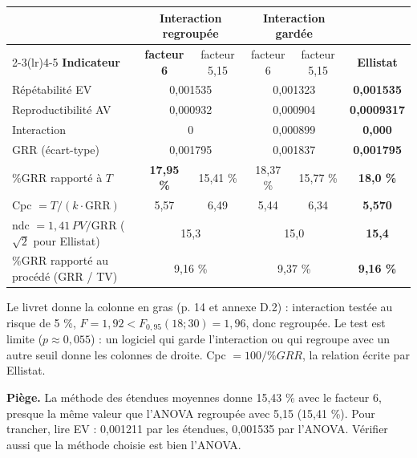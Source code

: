 \documentclass[10pt,a4paper]{article}
\begin{document}
\begin{tabularx}{\linewidth}{@{}X c c c c c@{}}
\toprule
 & \multicolumn{2}{c}{\textbf{Interaction regroupée}} & \multicolumn{2}{c}{\textbf{Interaction gardée}} & \\
\cmidrule(lr){2-3}\cmidrule(lr){4-5}
\textbf{Indicateur} & \textbf{facteur 6} & facteur 5,15 & facteur 6 & facteur 5,15 & \textbf{Ellistat}\\\midrule
Répétabilité EV & \multicolumn{2}{c}{0,001535} & \multicolumn{2}{c}{0,001323} & \textbf{0,001535}\\
Reproductibilité AV & \multicolumn{2}{c}{0,000932} & \multicolumn{2}{c}{0,000904} & \textbf{0,0009317}\\
Interaction & \multicolumn{2}{c}{0} & \multicolumn{2}{c}{0,000899} & \textbf{0,000}\\
GRR (écart-type) & \multicolumn{2}{c}{0,001795} & \multicolumn{2}{c}{0,001837} & \textbf{0,001795}\\
\%GRR rapporté à $T$ & \textbf{17,95 \%} & 15,41 \% & 18,37 \% & 15,77 \% & \textbf{18,0 \%}\\
Cpc $= T / (k\cdot\text{GRR})$ & 5,57 & 6,49 & 5,44 & 6,34 & \textbf{5,570}\\
ndc $= 1{,}41\,PV/\text{GRR}$ ($\sqrt2$ pour Ellistat) & \multicolumn{2}{c}{15,3} & \multicolumn{2}{c}{15,0} & \textbf{15,4}\\
\%GRR rapporté au procédé (GRR / TV) & \multicolumn{2}{c}{9,16 \%} & \multicolumn{2}{c}{9,37 \%} & \textbf{9,16 \%}\\
\bottomrule
\end{tabularx}
{\small Le livret donne la colonne en gras (p. 14 et annexe D.2) : interaction testée au risque de 5 \%, $F = 1{,}92 < F_{0{,}95}(18 ; 30) = 1{,}96$, donc regroupée. Le test est limite ($p \approx 0{,}055$) : un logiciel qui garde l'interaction ou qui regroupe avec un autre seuil donne les colonnes de droite. Cpc $= 100 / \%GRR$, la relation écrite par Ellistat.}

\begin{tcolorbox}[boite]
{\small \textbf{Piège.} La méthode des étendues moyennes donne 15,43 \% avec le facteur 6, presque la même valeur que l'ANOVA regroupée avec 5,15 (15,41 \%). Pour trancher, lire EV : 0,001211 par les étendues, 0,001535 par l'ANOVA. Vérifier aussi que la méthode choisie est bien l'ANOVA.}
\end{tcolorbox}
\end{document}
